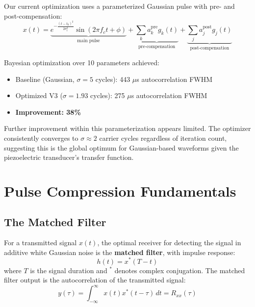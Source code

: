 \documentclass[11pt]{article}
\begin{document}
Our current optimization uses a parameterized Gaussian pulse with pre- and post-compensation:
\begin{equation}
x(t) = \underbrace{e^{-\frac{(t-t_0)^2}{2\sigma_t^2}} \sin(2\pi f_c t + \phi)}_{\text{main pulse}} + \underbrace{\sum_{k} a_k^{\text{pre}} g_k(t)}_{\text{pre-compensation}} + \underbrace{\sum_{j} a_j^{\text{post}} g_j(t)}_{\text{post-compensation}}
\end{equation}

Bayesian optimization over 10 parameters achieved:
\begin{itemize}
    \item Baseline (Gaussian, $\sigma = 5$ cycles): 443 $\mu$s autocorrelation FWHM
    \item Optimized V3 ($\sigma = 1.93$ cycles): 275 $\mu$s autocorrelation FWHM
    \item \textbf{Improvement: 38\%}
\end{itemize}

Further improvement within this parameterization appears limited. The optimizer consistently converges to $\sigma \approx 2$ carrier cycles regardless of iteration count, suggesting this is the global optimum for Gaussian-based waveforms given the piezoelectric transducer's transfer function.

\section{Pulse Compression Fundamentals}

\subsection{The Matched Filter}

For a transmitted signal $x(t)$, the optimal receiver for detecting the signal in additive white Gaussian noise is the \textbf{matched filter}, with impulse response:
\begin{equation}
h(t) = x^*(T - t)
\end{equation}
where $T$ is the signal duration and $^*$ denotes complex conjugation. The matched filter output is the autocorrelation of the transmitted signal:
\begin{equation}
y(\tau) = \int_{-\infty}^{\infty} x(t) x^*(t - \tau) \, dt = R_{xx}(\tau)
\end{equation}
\end{document}
